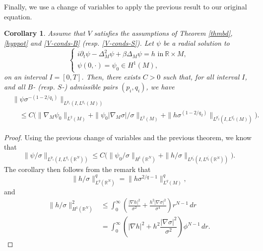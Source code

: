\documentclass[10pt,leqno]{amsart}
\newtheorem{cor}{Corollary}[section]
\numberwithin{equation}{section}
\newcommand{\field}[1]{\mathbb{#1}}
\newcommand{\R}{\field{R}}          		%
\begin{document}
Finally, we use a change of variables to apply the previous result to our original equation.
\begin{cor}
Assume that $V$ satisfies the assumptions of Theorem \ref{thmbd}, \eqref{hyppot} and \eqref{V-conds-B} (resp. \eqref{V-conds-S}). Let $\psi$ be a radial solution to
$$\begin{cases}
i\partial_t \psi-\Delta_M^2 \psi +\beta \Delta_M \psi= h
\mbox{ in}\ \R \times M,\\
 \psi(0,\cdot)=\psi_0 \in H^1 (M),
\end{cases}$$
 on an interval $I=[0,T]$.
Then, there exists $C>0$ such that, for all interval $I$, and all $B$- (resp. $S$-) admissible pairs $(p_i ,q_i)$, we have
\begin{align*}
&\big\|\psi \sigma^{-(1-2/q_1)}\big\|_{L^{p_1} (I, L^{q_1} (M)) }\\
&\quad \leq C \big(\|\nabla_{M} \psi_0\|_{L^2 (M)} +\|\psi_0 |\nabla_{M} \sigma|/\sigma \|_{L^2 (M)} + \|h\sigma^{(1- 2/q_2)} \|_{L^{p_2^\prime} (I, L^{q_2^\prime } (M))}  \big).
\end{align*}
\end{cor}
\begin{proof}
Using the previous change of variables and the previous theorem, we know that
$$\|\psi /\sigma\|_{L^{p_1} (I, L^{q_1} (\R^N)) } \leq C \big(\|\psi_0/\sigma\|_{H^1 (\R^N)} + \|h /\sigma \|_{L^{p_2^\prime} (I, L^{q_2^\prime } (\R^N))}  \big).$$
The corollary then follows from the remark that
$$\|h/\sigma\|^q_{L^q (\R^N)}=\|h \sigma^{2/q -1}\|^q_{L^q (M)} ,$$
and
\begin{align*}
\|h/\sigma\|^2_{H^1 (\R^N)} & \leq \int_0^\infty \left(\frac{|\nabla h|^2}{\sigma^2} +\frac{h^2 |\nabla \sigma|^2}{\sigma^4}\right) r^{N-1}\,dr \\
& = \int_0^\infty \left(|\nabla h|^2 +h^2 \dfrac{|\nabla \sigma|^2}{\sigma^2}\right)\phi^{N-1}\, dr .
\end{align*}

\end{proof}
\end{document}
